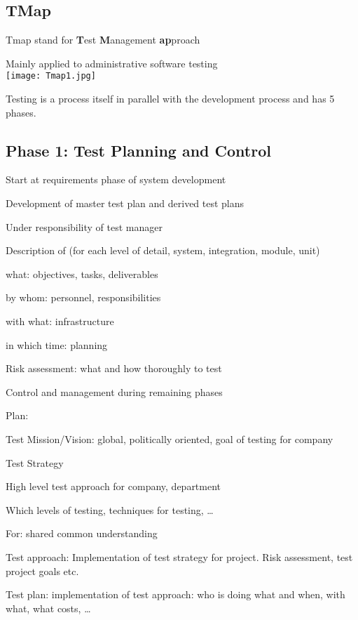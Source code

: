 \subsection{TMap}
Tmap stand for \textbf{T}est \textbf{M}anagement \textbf{ap}proach

Mainly applied to administrative software testing\\
\texttt{[image: Tmap1.jpg]}

Testing is a process itself in parallel with the development process and has 5 phases.
\subsection{Phase 1: Test Planning and Control}
\begin{itemize*}
    \item Start at requirements phase of system development
    \item Development of master test plan and derived test plans
    \item Under responsibility of test manager
    \item Description of (for each level of detail, system, integration, module, unit)
        \begin{itemize*}
            \item what: objectives, tasks, deliverables
            \item by whom: personnel, responsibilities
            \item with what: infrastructure
            \item in which time: planning
        \end{itemize*}
    \item Risk assessment: what and how thoroughly to test
    \item Control and management during remaining phases
\end{itemize*}

Plan:
\begin{itemize*}
    \item Test Mission/Vision: global, politically oriented, goal of testing for company
    \item Test Strategy
        \begin{itemize*}
            \item High level test approach for company, department
            \item Which levels of testing, techniques for testing, \ldots
            \item For: shared common understanding
        \end{itemize*}
    \item Test approach: Implementation of test strategy for project. Risk assessment, test project goals etc.
    \item Test plan: implementation of test approach: who is doing what and when, with what, what costs, \ldots
\end{itemize*}

